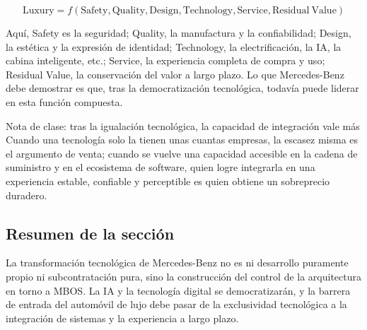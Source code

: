\[
\mathrm{Luxury}=f(\mathrm{Safety},\mathrm{Quality},\mathrm{Design},\mathrm{Technology},\mathrm{Service},\mathrm{Residual\ Value})
\]

Aquí, Safety es la seguridad; Quality, la manufactura y la confiabilidad; Design, la estética y la expresión de identidad; Technology, la electrificación, la IA, la cabina inteligente, etc.; Service, la experiencia completa de compra y uso; Residual Value, la conservación del valor a largo plazo. Lo que Mercedes-Benz debe demostrar es que, tras la democratización tecnológica, todavía puede liderar en esta función compuesta.

\begin{knowledgebox}{Nota de clase: tras la igualación tecnológica, la capacidad de integración vale más}
Cuando una tecnología solo la tienen unas cuantas empresas, la escasez misma es el argumento de venta; cuando se vuelve una capacidad accesible en la cadena de suministro y en el ecosistema de software, quien logre integrarla en una experiencia estable, confiable y perceptible es quien obtiene un sobreprecio duradero.
\end{knowledgebox}

\subsection{Resumen de la sección}

La transformación tecnológica de Mercedes-Benz no es ni desarrollo puramente propio ni subcontratación pura, sino la construcción del control de la arquitectura en torno a MBOS. La IA y la tecnología digital se democratizarán, y la barrera de entrada del automóvil de lujo debe pasar de la exclusividad tecnológica a la integración de sistemas y la experiencia a largo plazo.
